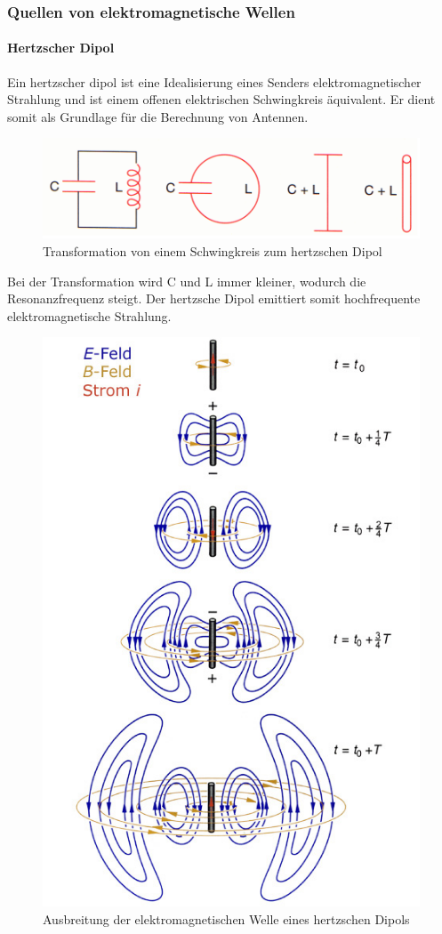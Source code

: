 		\subsubsection{Quellen von elektromagnetische Wellen}
			\paragraph{Hertzscher Dipol}
				Ein hertzscher dipol ist eine Idealisierung eines Senders elektromagnetischer Strahlung und ist einem offenen elektrischen Schwingkreis äquivalent. Er dient somit als Grundlage für die Berechnung von Antennen.
				\begin{figure}[h]
					\centering
					\includegraphics[width=0.6\linewidth]{./pics/ph/hertz}
					\caption{Transformation von einem Schwingkreis zum hertzschen Dipol}
				\end{figure}
				Bei der Transformation wird C und L immer kleiner, wodurch die Resonanzfrequenz steigt. Der hertzsche Dipol emittiert somit hochfrequente elektromagnetische Strahlung.
				\begin{figure}[h]
					\centering
					\includegraphics[width=0.4\linewidth]{./pics/ph/hertz2}
					\caption{Ausbreitung der elektromagnetischen Welle eines hertzschen Dipols}
				\end{figure}

